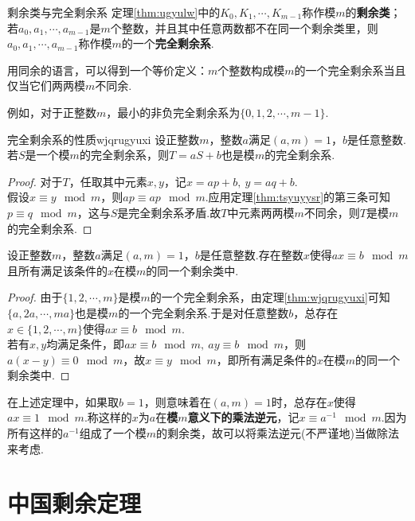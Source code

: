 \documentclass[lang=cn, zihao=5]{elegantbook}
\begin{document}
\begin{definition}{剩余类与完全剩余系}
	定理\ref{thm:ugyulw}中的$K_0,K_1, \cdots ,K_{m-1}$称作模$m$的\textbf{剩余类}；若$a_0,a_1,\cdots ,a_{m-1}$是$m$个整数，并且其中任意两数都不在同一个剩余类里，则$a_0,a_1,\cdots ,a_{m-1}$称作模$m$的一个\textbf{完全剩余系}.
\end{definition}
\begin{remark}
	用同余的语言，可以得到一个等价定义：$m$个整数构成模$m$的一个完全剩余系当且仅当它们两两模$m$不同余.
\end{remark}

例如，对于正整数$m$，最小的非负完全剩余系为$\{ 0,1,2,\cdots ,m-1 \}$.

\begin{theorem}{完全剩余系的性质}{wjqrugyuxi}
	设正整数$m$，整数$a$满足$(a,m)=1$，$b$是任意整数.若$S$是一个模$m$的完全剩余系，则$T=aS+b$也是模$m$的完全剩余系.
\end{theorem}
\begin{proof}
	对于$T$，任取其中元素$x,y$，记$x=ap+b,~y=aq+b$. \\
	假设$x \equiv y \mod m$，则$ap \equiv ap \mod m$.应用定理\ref{thm:tsyuyysr}的第三条可知$p \equiv q \mod m$，这与$S$是完全剩余系矛盾.故$T$中元素两两模$m$不同余，则$T$是模$m$的完全剩余系.
\end{proof}

\begin{theorem}
	设正整数$m$，整数$a$满足$(a,m)=1$，$b$是任意整数.存在整数$x$使得$ax \equiv b \mod m$且所有满足该条件的$x$在模$m$的同一个剩余类中.
\end{theorem}
\begin{proof}
	由于$\{ 1,2,\cdots ,m \}$是模$m$的一个完全剩余系，由定理\ref{thm:wjqrugyuxi}可知$\{ a,2a,\cdots ,ma \}$也是模$m$的一个完全剩余系.于是对任意整数$b$，总存在$x \in \{ 1,2,\cdots ,m \}$使得$ax \equiv b \mod m$. \\
	若有$x,y$均满足条件，即$ax \equiv b \mod m,~ay \equiv b \mod m$，则$a(x-y) \equiv 0 \mod m$，故$x \equiv y \mod m$，即所有满足条件的$x$在模$m$的同一个剩余类中.
\end{proof}

在上述定理中，如果取$b=1$，则意味着在$(a,m)=1$时，总存在$x$使得$ax \equiv 1 \mod m$.称这样的$x$为$a$在\textbf{模$m$意义下的乘法逆元}，记$x \equiv a^{-1} \mod m$.因为所有这样的$a^{-1}$组成了一个模$m$的剩余类，故可以将乘法逆元(不严谨地)当做除法来考虑.

\section{中国剩余定理}
\end{document}
